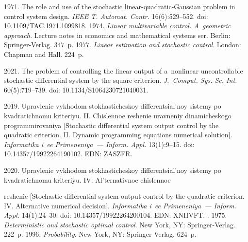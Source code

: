   \begin{multicols}{2}

\renewcommand{\bibname}{\protect\rmfamily References}

{\small\frenchspacing
 {%
 \begin{thebibliography}{99} 
       1971. The role and use of the stochastic 
 linear-quadratic-Gaussian problem in control system design. \textit{IEEE T. 
Automat. Contr.} 16(6):529--552. doi: 10.1109/TAC.1971.1099818.
       1974. \textit{Linear multivariable control. 
A~geometric approach.} Lecture notes in economics and mathematical systems 
ser. Berlin: Springer-Verlag. 347~p.
       1977. \textit{Linear estimation and stochastic 
control}. London: Chapman and Hall. 224~p.



       2021. The problem of controlling the linear output of 
a~nonlinear uncontrollable stochastic differential system by the square criterion. 
\textit{J.~Comput. Sys. Sc. Int.} 60(5):719--739. doi: 
10.1134/S1064230721040031.


       2019. Upravlenie vykhodom 
stokhasticheskoy differentsial'noy sistemy po kvadratichnomu kriteriyu. II. 
Chislennoe reshenie uravneniy dinamicheskogo programmirovaniya [Stochastic 
differential system output control by the quadratic criterion. II. Dynamic 
programming equations numerical solution]. \textit{Informatika i~ee 
Primeneniya~--- Inform. \mbox{Appl.}} 13(1):9--15. doi: 10.14357/19922264190102. EDN: 
\mbox{ZASZFR}.




       2020. Upravlenie vykhodom 
sto\-kha\-sti\-che\-skoy differentsial'noy sistemy po
kvadratichnomu kriteriyu. IV. 
Al'ternativnoe chislennoe\linebreak\vspace*{-12pt}

\pagebreak

\noindent
  reshenie [Stochastic differential system output control 
by the quadratic criterion. IV. Alternative numerical decision]. \textit{Informatika 
i~ee Primeneniya~--- Inform. \mbox{Appl.}} 14(1):24--30. doi: 
10.14357/19922264200104. EDN: \mbox{XNHVFT}.
      . 1975. \textit{Deterministic and 
stochastic optimal control}. New York, NY: Springer-Verlag. 222~p.
       1996. \textit{Probability}. New York, NY: Springer 
Verlag. 624~p.




\end{thebibliography}}}
\end{multicols}
